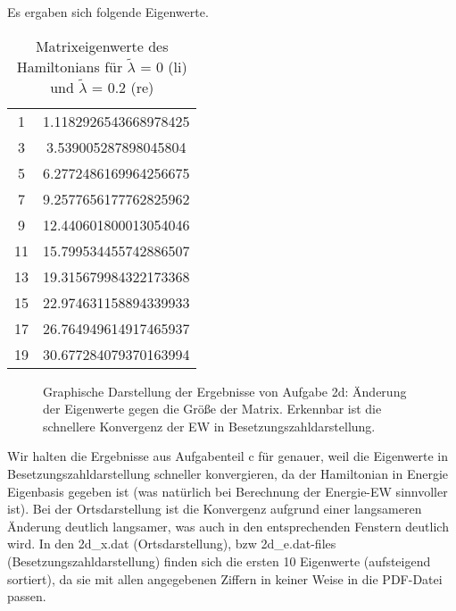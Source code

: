 Es ergaben sich folgende Eigenwerte.
\begin{table}[]
\centering
\caption{Matrixeigenwerte des Hamiltonians für $\tilde{\lambda}$ = 0 (li) und $\tilde{\lambda}$ = 0.2 (re)}
\label{table:2beigenvalues}
\begin{tabular}{cc}
1 &1.1182926543668978425 \\
3 &3.539005287898045804 \\
5 &6.2772486169964256675 \\
7 &9.2577656177762825962 \\
9 &12.440601800013054046 \\
11 &15.799534455742886507 \\
13 & 19.315679984322173368 \\
15 &22.974631158894339933 \\
17 &26.764949614917465937 \\
19 &30.677284079370163994 \\
\end{tabular}
\end{table}

\begin{landscape}
	\begin{figure}
		\caption{Graphische Darstellung der Ergebnisse von Aufgabe 2d: Änderung der Eigenwerte gegen die Größe der Matrix. Erkennbar ist die schnellere Konvergenz der EW in Besetzungszahldarstellung.}
		\label{fig:1a}
	\end{figure}
\end{landscape}

Wir halten die Ergebnisse aus Aufgabenteil c für genauer, weil die Eigenwerte in Besetzungszahldarstellung schneller konvergieren, da der Hamiltonian in Energie Eigenbasis gegeben ist (was natürlich bei Berechnung der Energie-EW sinnvoller ist). Bei der Ortsdarstellung ist die Konvergenz aufgrund einer langsameren Änderung deutlich langsamer, was auch in den entsprechenden Fenstern deutlich wird. In den 2d\_x.dat (Ortsdarstellung), bzw 2d\_e.dat-files (Besetzungszahldarstellung) finden sich die ersten 10 Eigenwerte (aufsteigend sortiert), da sie mit allen angegebenen Ziffern in keiner Weise in die PDF-Datei passen.



